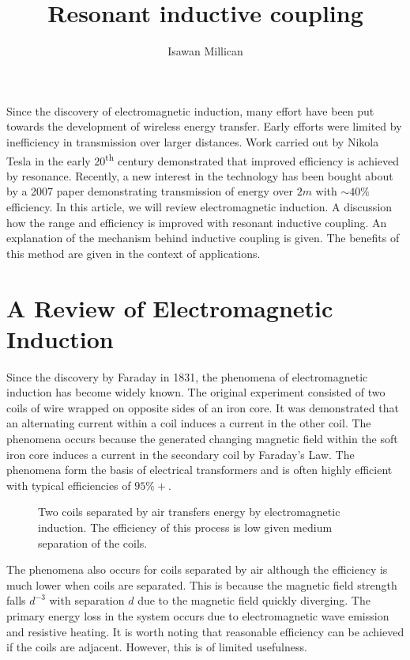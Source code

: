 \documentclass[a4paper,justified,nobib]{tufte-handout}
\begin{document}
\title{Resonant inductive coupling}
\author{Isawan Millican}
\maketitle

Since the discovery of electromagnetic induction,
many effort have been put towards the development of wireless energy transfer.
Early efforts were limited by inefficiency in transmission over larger distances.
Work carried out by Nikola Tesla in the early 20\textsuperscript{th} century
demonstrated that improved efficiency is achieved by resonance.\cite{tesla}
Recently, a new interest in the technology has been bought about by a 2007
paper demonstrating transmission of energy over $2m$ with $\sim40\%$ efficiency.
In this article, we will review electromagnetic induction.
A discussion how the range and efficiency is improved with
resonant inductive coupling.
An explanation of the mechanism behind inductive coupling is given.
The benefits of this method are given in the context of applications.



\section{A Review of Electromagnetic Induction}

Since the discovery by Faraday in 1831\cite{faradaypublishedfirst},
the phenomena of electromagnetic induction has become widely known.
The original experiment consisted of two coils of wire wrapped on opposite
sides of an iron core.
It was demonstrated that an alternating current within a coil induces
a current in the other coil.
The phenomena occurs because the generated changing magnetic
field within the soft iron core induces a current in the secondary coil by
Faraday's Law.
The phenomena form the basis of electrical transformers and
is often highly efficient with typical efficiencies of $95\%+$.

\begin{figure}
  \center
  
  \caption{Two coils separated by air transfers energy by
  electromagnetic induction.
  The efficiency of this process is low given medium separation of the coils.}
\end{figure}

The phenomena also occurs for coils separated by air
although the efficiency is much lower when coils are separated.
This is because the magnetic field strength falls $d^{-3}$ with separation $d$
due to the magnetic field quickly diverging.
The primary energy loss in the system occurs due to electromagnetic wave emission
and resistive heating.
It is worth noting that reasonable efficiency can be achieved if the coils
are adjacent.
However, this is of limited usefulness.
\end{document}
